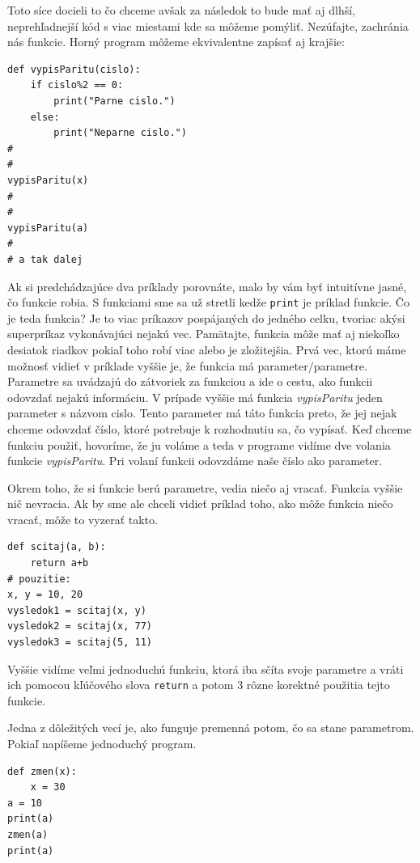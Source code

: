 \documentclass{article}
\begin{document}
Toto síce docieli to čo chceme avšak za následok to bude mať aj dlhší, neprehľadnejší kód s viac miestami kde sa môžeme pomýliť. Nezúfajte, zachránia nás funkcie. Horný program môžeme ekvivalentne zapísať aj krajšie:

\begin{lstlisting}
def vypisParitu(cislo):
    if cislo%2 == 0:
        print("Parne cislo.")
    else:
        print("Neparne cislo.")
#   
#
vypisParitu(x)
#
#
vypisParitu(a)
#
# a tak dalej
\end{lstlisting}

Ak si predchádzajúce dva príklady porovnáte, malo by vám byť intuitívne jasné, čo funkcie robia. S funkciami sme sa už stretli kedže \texttt{print} je príklad funkcie. Čo je teda funkcia? Je to viac príkazov pospájaných do jedného celku, tvoriac akýsi superpríkaz vykonávajúci nejakú vec. Pamätajte, funkcia môže mať aj niekoľko desiatok riadkov pokiaľ toho robí viac alebo je zložitejšia. Prvá vec, ktorú máme možnosť vidieť v príklade vyššie je, že funkcia má parameter/parametre. Parametre sa uvádzajú do zátvoriek za funkciou a ide o cestu, ako funkcii odovzdať nejakú informáciu. V prípade vyššie má funkcia \textit{vypisParitu} jeden parameter s názvom cislo. Tento parameter má táto funkcia preto, že jej nejak chceme odovzdať číslo, ktoré potrebuje k rozhodnutiu sa, čo vypísať. Keď chceme funkciu použiť, hovoríme, že ju voláme a teda v programe vidíme dve volania funkcie \textit{vypisParitu}. Pri volaní funkcii odovzdáme naše číslo ako parameter.

Okrem toho, že si funkcie berú parametre, vedia niečo aj vracať. Funkcia vyššie nič nevracia. Ak by sme ale chceli vidieť príklad toho, ako môže funkcia niečo vracať, môže to vyzerať takto.

\begin{lstlisting}
def scitaj(a, b):
    return a+b
# pouzitie:
x, y = 10, 20
vysledok1 = scitaj(x, y)
vysledok2 = scitaj(x, 77)
vysledok3 = scitaj(5, 11)
\end{lstlisting}

Vyššie vidíme veľmi jednoduchú funkciu, ktorá iba sčíta svoje parametre a vráti ich pomocou kľúčového slova \texttt{return} a potom 3 rôzne korektné použitia tejto funkcie.

Jedna z dôležitých vecí je, ako funguje premenná potom, čo sa stane parametrom. Pokiaľ napíšeme jednoduchý program.

\begin{lstlisting}
def zmen(x):
    x = 30
a = 10
print(a)
zmen(a)
print(a)
\end{lstlisting}
\end{document}
